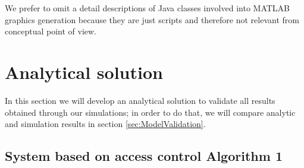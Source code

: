 \documentclass[10pt,a4paper]{article}
\begin{document}
We prefer to omit a detail descriptions of Java classes involved into MATLAB graphics generation because they are just scripts and therefore not relevant from conceptual point of view. 

\newpage
\section{Analytical solution}

In this section we will develop an analytical solution to validate all results obtained through our simulations; in order to do that, we will compare analytic and simulation results in section \ref{sec:ModelValidation}.

\subsection{System based on access control Algorithm 1}\label{subsub:alg1}
\end{document}
